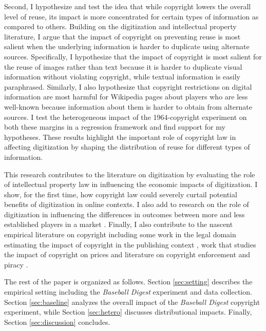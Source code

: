 \documentclass[11pt]{article}
\begin{document}
Second, I hypothesize and test the idea that while copyright lowers the overall level of reuse, its impact is more concentrated for certain types of information as compared to others. Building on the digitization and intellectual property literature, I argue that the impact of copyright on preventing reuse is most salient when the underlying information is harder to duplicate using alternate sources. Specifically, I hypothesize that the impact of copyright is most salient for the reuse of images rather than text because it is harder to duplicate visual information without violating copyright, while textual information is easily paraphrased. Similarly, I also hypothesize that copyright restrictions on digital information are most harmful for Wikipedia pages about players who are less well-known because information about them is harder to obtain from alternate sources. I test the heterogeneous impact of the 1964-copyright experiment on both these margins in a regression framework and find support for my hypotheses. These results highlight the important role of copyright law in affecting digitization by shaping the distribution of reuse for different types of information. 

This research contributes to the literature on digitization \citep{goldfarb_effect_2012, miller_can_2011, waldfogel_digitization_2014} by evaluating the role of intellectual property law in influencing the economic impacts of digitization. I show, for the first time, how copyright law could severely curtail potential benefits of digitization in online contexts. I also add to research on the role of digitization in influencing the differences in outcomes between more and less established players in a market \citep{qian_counterfeiters:_2014, mortimer_supply_2012, zhang_intellectual_2014, nagaraj_private_2015, brynjolfsson_niches_2006}. Finally, I also contribute to the nascent empirical literature on copyright including some work in the legal domain estimating the impact of copyright in the publishing context \citep{heald_property_2007, heald_testing_2009, buccafusco_bad_2012}, work that studies the impact of copyright on prices \citep{li_dead_2012, reimers_effects_2013, mortimer_price_2007-2} and literature on copyright enforcement and piracy \citep{aguiar_digitization_2014, luo_copyright_2015-1, danaher_converting_2010}.

The rest of the paper is organized as follows. Section \ref{sec:setting} describes the empirical setting including the \emph{Baseball Digest} experiment and data collection. Section \ref{sec:baseline} analyzes the overall impact of the \emph{Baseball Digest} copyright experiment, while Section \ref{sec:hetero} discusses distributional impacts. Finally, Section \ref{sec:discussion} concludes. 
\end{document}
